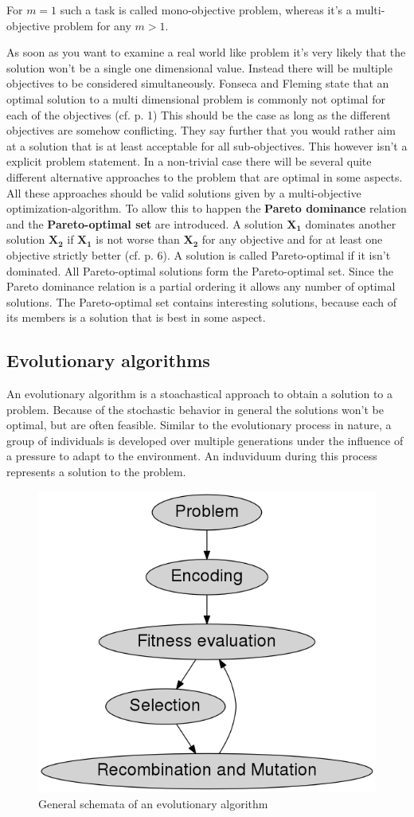\documentclass[12pt,twoside]{article}
\theoremstyle{plain}
\theoremstyle{definition}
\theoremstyle{remark}
\begin{document}
For $m = 1$ such a task is called mono-objective problem, whereas it's a multi-objective problem for any $m > 1$.

As soon as you want to examine a real world like problem it's very likely that the solution won't be a single one dimensional value. Instead there will be multiple objectives to be considered simultaneously.
Fonseca and Fleming state that an optimal solution to a multi dimensional problem is commonly not optimal for each of the objectives (cf. \cite{fonseca1995overview} p. 1)
This should be the case as long as the different objectives are somehow conflicting.
They say further that you would rather aim at a solution that is at least acceptable for all sub-objectives.
This however isn't a explicit problem statement. In a non-trivial case there will be several quite different alternative approaches to the problem that are optimal in some aspects.
All these approaches should be valid solutions given by a multi-objective optimization-algorithm.
To allow this to happen the \textbf{Pareto dominance} relation and the \textbf{Pareto-optimal set} are introduced.
A solution $\mathbf{X_1}$ dominates another solution $\mathbf{X_2}$ if $\mathbf{X_1}$ is not worse than $\mathbf{X_2}$ for any objective and for at least one objective strictly better (cf. \cite{doncieux2015multi} p. 6).
A solution is called Pareto-optimal if it isn't dominated. All Pareto-optimal solutions form the Pareto-optimal set. 
Since the Pareto dominance relation is a partial ordering it allows any number of optimal solutions.
The Pareto-optimal set contains interesting solutions, because each of its members is a solution that is best in some aspect.

\subsection{Evolutionary algorithms}
\label{back:evo}
An evolutionary algorithm is a stoachastical approach to obtain a solution to a problem. Because of the stochastic behavior in general the solutions won't be optimal, but are often feasible. Similar to the evolutionary process in nature, a group of individuals is developed over multiple generations under the influence of a pressure to adapt to the environment. An induviduum during this process represents a solution to the problem.\medskip

\begin{figure}
	\begin{center}
		\includegraphics[height=.4\textwidth]{Bilder/evo.png}
	\end{center}
	\caption{General schemata of an evolutionary algorithm}
	\label{fig:evo}
\end{figure}
\end{document}
